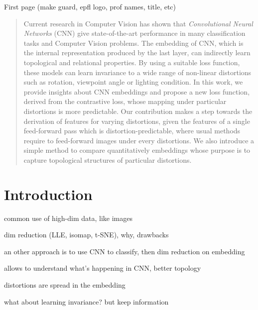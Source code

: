 \documentclass[a4paper,12pt]{report}
\begin{document}
\thispagestyle{empty}
First page (make guard, epfl logo, prof names, title, etc)

\newpage
\begin{abstract}
    Current research in Computer Vision has shown that {\em Convolutional Neural Networks} (CNN) give state-of-the-art performance in many classification tasks and Computer Vision problems\cite{mnist_web}\cite{krizhevsky2012imagenet}\cite{rowley1998neural}\cite{prechelt1994proben1}.
    The embedding of CNN, which is the internal representation produced by the last layer, can indirectly learn topological and relational properties.
    By using a suitable loss function, these models can learn invariance to a wide range of non-linear distortions such as rotation, viewpoint angle or lighting condition.
    In this work, we provide insights about CNN embeddings and propose a new loss function, derived from the contrastive loss, whose mapping under particular distortions is more predictable.
    Our contribution makes a step towards the derivation of features for varying distortions, given the features of a single feed-forward pass which is distortion-predictable, where usual methods require to feed-forward images under every distortions.
    We also introduce a simple method to compare quantitatively embeddings whose purpose is to capture topological structures of particular distortions.
\end{abstract}

\tableofcontents


\chapter{Introduction}

common use of high-dim data, like images

dim reduction (LLE, isomap, t-SNE), why, drawbacks

an other approach is to use CNN to classify, then dim reduction on embedding

allows to understand what's happening in CNN, better topology

distortions are spread in the embedding

what about learning invariance? but keep information
\end{document}
